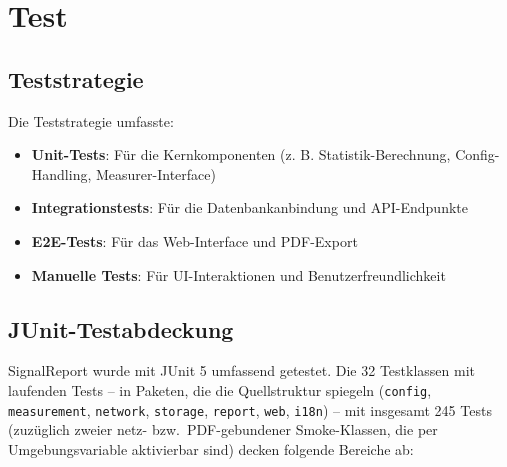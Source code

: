 \section{Test}
\label{sec:test}

\subsection{Teststrategie}
Die Teststrategie umfasste:

\begin{itemize}
    \item \textbf{Unit-Tests}: Für die Kernkomponenten (z. B. Statistik-Berechnung, Config-Handling, Measurer-Interface)
    \item \textbf{Integrationstests}: Für die Datenbankanbindung und API-Endpunkte
    \item \textbf{E2E-Tests}: Für das Web-Interface und PDF-Export
    \item \textbf{Manuelle Tests}: Für UI-Interaktionen und Benutzerfreundlichkeit
\end{itemize}

\subsection{JUnit-Testabdeckung}
SignalReport wurde mit JUnit 5 umfassend getestet. Die 32 Testklassen mit laufenden Tests -- in Paketen, die die Quellstruktur spiegeln (\texttt{config}, \texttt{measurement}, \texttt{network}, \texttt{storage}, \texttt{report}, \texttt{web}, \texttt{i18n}) -- mit insgesamt 245 Tests (zuzüglich zweier netz- bzw.\ PDF-gebundener Smoke-Klassen, die per Umgebungsvariable aktivierbar sind) decken folgende Bereiche ab:

